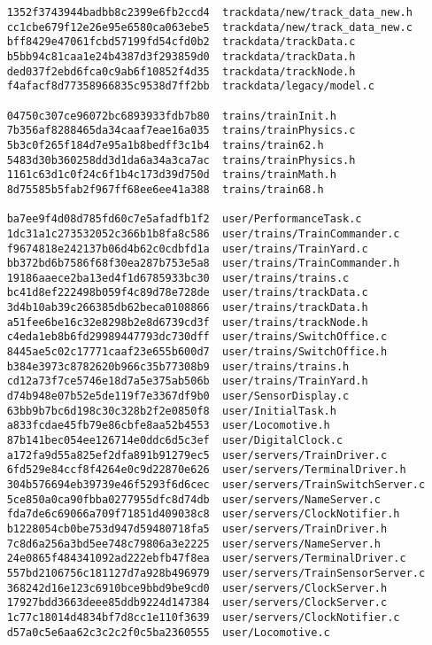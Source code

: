 \documentclass[twoside,a4paper]{refart}
\begin{document}
\begin{verbatim}
    1352f3743944badbb8c2399e6fb2ccd4  trackdata/new/track_data_new.h
    cc1cbe679f12e26e95e6580ca063ebe5  trackdata/new/track_data_new.c
    bff8429e47061fcbd57199fd54cfd0b2  trackdata/trackData.c
    b5bb94c81caa1e24b4387d3f293859d0  trackdata/trackData.h
    ded037f2ebd6fca0c9ab6f10852f4d35  trackdata/trackNode.h
    f4afacf8d77358966835c9538d7ff2bb  trackdata/legacy/model.c

    04750c307ce96072bc6893933fdb7b80  trains/trainInit.h
    7b356af8288465da34caaf7eae16a035  trains/trainPhysics.c
    5b3c0f265f184d7e95a1b8bedff3c1b4  trains/train62.h
    5483d30b360258dd3d1da6a34a3ca7ac  trains/trainPhysics.h
    1161c63d1c0f24c6f1b4c173d39d750d  trains/trainMath.h
    8d75585b5fab2f967ff68ee6ee41a388  trains/train68.h

    ba7ee9f4d08d785fd60c7e5afadfb1f2  user/PerformanceTask.c
    1dc31a1c273532052c366b1b8fa8c586  user/trains/TrainCommander.c
    f9674818e242137b06d4b62c0cdbfd1a  user/trains/TrainYard.c
    bb372bd6b7586f68f30ea287b753e5a8  user/trains/TrainCommander.h
    19186aaece2ba13ed4f1d6785933bc30  user/trains/trains.c
    bc41d8ef222498b059f4c89d78e728de  user/trains/trackData.c
    3d4b10ab39c266385db62beca0108866  user/trains/trackData.h
    a51fee6be16c32e8298b2e8d6739cd3f  user/trains/trackNode.h
    c4eda1eb8b6fd29989447793dc730dff  user/trains/SwitchOffice.c
    8445ae5c02c17771caaf23e655b600d7  user/trains/SwitchOffice.h
    b384e3973c8782620b966c35b77308b9  user/trains/trains.h
    cd12a73f7ce5746e18d7a5e375ab506b  user/trains/TrainYard.h
    d74b948e07b52e5de119f7e3367df9b0  user/SensorDisplay.c
    63bb9b7bc6d198c30c328b2f2e0850f8  user/InitialTask.h
    a833fcdae45fb79e86cbfe8aa52b4553  user/Locomotive.h
    87b141bec054ee126714e0ddc6d5c3ef  user/DigitalClock.c
    a172fa9d55a825ef2dfa891b91279ec5  user/servers/TrainDriver.c
    6fd529e84ccf8f4264e0c9d22870e626  user/servers/TerminalDriver.h
    304b576694eb39739e46f5293f6d6cec  user/servers/TrainSwitchServer.c
    5ce850a0ca90fbba0277955dfc8d74db  user/servers/NameServer.c
    fda7de6c69066a709f71851d409038c8  user/servers/ClockNotifier.h
    b1228054cb0be753d947d59480718fa5  user/servers/TrainDriver.h
    7c8d6a256a3bd5ee748c79806a3e2225  user/servers/NameServer.h
    24e0865f484341092ad222ebfb47f8ea  user/servers/TerminalDriver.c
    557bd2106756c181127d7a928b496979  user/servers/TrainSensorServer.c
    368242d16e123c6910bce9bbd9be9cd0  user/servers/ClockServer.h
    17927bdd3663deee85ddb9224d147384  user/servers/ClockServer.c
    1c77c18014d4834bf7d8cc1e110f3639  user/servers/ClockNotifier.c
    d57a0c5e6aa62c3c2c2f0c5ba2360555  user/Locomotive.c

\end{verbatim}
\end{document}
